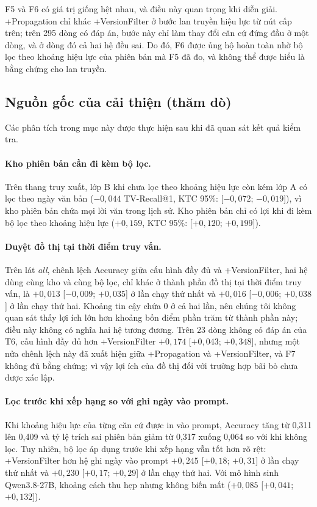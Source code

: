 \documentclass[11pt,a4paper]{article}
\begin{document}
F5 và F6 có giá trị giống hệt nhau, và điều này quan trọng khi diễn giải. +Propagation chỉ khác +VersionFilter ở bước lan truyền hiệu lực từ nút cấp trên; trên 295 dòng có đáp án, bước này chỉ làm thay đổi căn cứ đứng đầu ở một dòng, và ở dòng đó cả hai hệ đều sai. Do đó, F6 được ủng hộ hoàn toàn nhờ bộ lọc theo khoảng hiệu lực của phiên bản mà F5 đã đo, và không thể được hiểu là bằng chứng cho lan truyền.

\subsection{Nguồn gốc của cải thiện (thăm dò)}
Các phân tích trong mục này được thực hiện sau khi đã quan sát kết quả kiểm tra.

\paragraph{Kho phiên bản cần đi kèm bộ lọc.} Trên thang truy xuất, lớp B khi chưa lọc theo khoảng hiệu lực còn kém lớp A có lọc theo ngày văn bản ($-0{,}044$ TV-Recall@1, KTC 95\%: [$-0{,}072$; $-0{,}019$]), vì kho phiên bản chứa mọi lời văn trong lịch sử. Kho phiên bản chỉ có lợi khi đi kèm bộ lọc theo khoảng hiệu lực ($+0{,}159$, KTC 95\%: [$+0{,}120$; $+0{,}199$]).

\paragraph{Duyệt đồ thị tại thời điểm truy vấn.} Trên lát \emph{all}, chênh lệch Accuracy giữa cấu hình đầy đủ và +VersionFilter, hai hệ dùng cùng kho và cùng bộ lọc, chỉ khác ở thành phần đồ thị tại thời điểm truy vấn, là $+0{,}013$ [$-0{,}009$; $+0{,}035$] ở lần chạy thứ nhất và $+0{,}016$ [$-0{,}006$; $+0{,}038$] ở lần chạy thứ hai. Khoảng tin cậy chứa 0 ở cả hai lần, nên chúng tôi không quan sát thấy lợi ích lớn hơn khoảng bốn điểm phần trăm từ thành phần này; điều này không có nghĩa hai hệ tương đương. Trên 23 dòng không có đáp án của T6, cấu hình đầy đủ hơn +VersionFilter $+0{,}174$ [$+0{,}043$; $+0{,}348$], nhưng một nửa chênh lệch này đã xuất hiện giữa +Propagation và +VersionFilter, và F7 không đủ bằng chứng; vì vậy lợi ích của đồ thị đối với trường hợp bãi bỏ chưa được xác lập.

\paragraph{Lọc trước khi xếp hạng so với ghi ngày vào prompt.} Khi khoảng hiệu lực của từng căn cứ được in vào prompt, Accuracy tăng từ 0,311 lên 0,409 và tỷ lệ trích sai phiên bản giảm từ 0,317 xuống 0,064 so với khi không lọc. Tuy nhiên, bộ lọc áp dụng trước khi xếp hạng vẫn tốt hơn rõ rệt: +VersionFilter hơn hệ ghi ngày vào prompt $+0{,}245$ [$+0{,}18$; $+0{,}31$] ở lần chạy thứ nhất và $+0{,}230$ [$+0{,}17$; $+0{,}29$] ở lần chạy thứ hai. Với mô hình sinh Qwen3.8-27B, khoảng cách thu hẹp nhưng không biến mất ($+0{,}085$ [$+0{,}041$; $+0{,}132$]).
\end{document}
